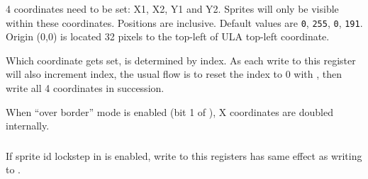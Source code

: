 \subsubsection{}



\subsubsection{}

\begin{NextPort}
\end{NextPort}

4 coordinates need to be set: X1, X2, Y1 and Y2. Sprites will only be visible within these coordinates. Positions are inclusive. Default values are {\tt 0}, {\tt 255}, {\tt 0}, {\tt 191}. Origin (0,0) is located 32 pixels to the top-left of ULA top-left coordinate.

Which coordinate gets set, is determined by index. As each write to this register will also increment index, the usual flow is to reset the index to 0 with , then write all 4 coordinates in succession.

When ``over border'' mode is enabled (bit 1 of ), X coordinates are doubled internally.


\subsubsection{}



\subsubsection{}

If sprite id lockstep in  is enabled, write to this registers has same effect as writing to .

\begin{NextPort}
\end{NextPort}


